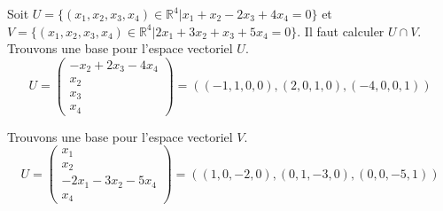 \documentclass[]{book}
\theoremstyle{definition}
\newcommand{\bb}[1]{\mathbb{#1}}
\newcommand{\R}{\bb{R}}
\begin{document}
Soit $U=\{(x_1,x_2,x_3,x_4) \in \R^4 | x_1+x_2-2x_3+4x_4 = 0\}$ et $V=\{(x_1,x_2,x_3,x_4) \in \R^4 | 2x_1+3x_2+x_3+5x_4 = 0\}$. Il faut calculer $U \cap V$.\\
Trouvons une base pour l'espace vectoriel $U$. 
$$U=\begin{pmatrix} -x_2+2x_3-4x_4 \\ x_2 \\ x_3 \\ x_4 \end{pmatrix} = ((-1,1,0,0),(2,0,1,0),(-4,0,0,1))$$ 

Trouvons une base pour l'espace vectoriel $V$. 
$$U=\begin{pmatrix} x_1 \\ x_2 \\ -2x_1-3x_2-5x_4 \\ x_4 \end{pmatrix} = ((1,0,-2,0),(0,1,-3,0),(0,0,-5,1))$$ 
\end{document}
